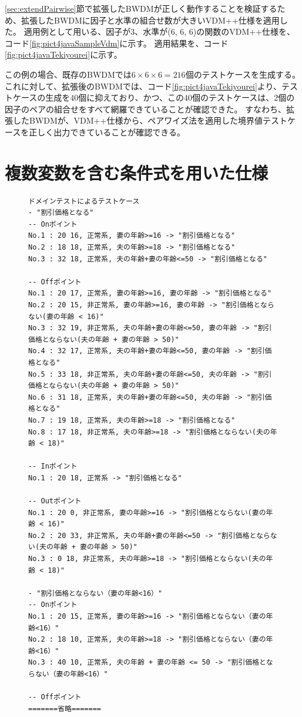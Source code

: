 \documentclass[uplatex, report, a4j, 10pt]{jsbook}
\begin{document}
\ref{sec:extendPairwise}節で拡張したBWDMが正しく動作することを検証するため、拡張したBWDMに因子と水準の組合せ数が大きいVDM++仕様を適用した。
適用例として用いる、因子が3、水準が(6, 6, 6)の関数のVDM++仕様を、コード\ref{fig:pict4javaSampleVdm}に示す。
適用結果を、コード\ref{fig:pict4javaTekiyourei}に示す。

この例の場合、既存のBWDMでは$6 \times 6 \times 6 = 216個$のテストケースを生成する。
これに対して、拡張後のBWDMでは、コード\ref{fig:pict4javaTekiyourei}より、テストケースの生成を40個に抑えており、かつ、この40個のテストケースは、2個の因子のペアの組合せをすべて網羅できていることが確認できた。
すなわち、拡張したBWDMが、VDM++仕様から、ペアワイズ法を適用した境界値テストケースを正しく出力できていることが確認できる。


\section{複数変数を含む条件式を用いた仕様}
\lstset{language=}
\begin{figure}[tp]
  \begin{lstlisting}[caption={拡張したBWDMに遊園地チケット割引機能(コード\ref{fig:vdm_park})を適用した際の出力の一部},label=fig:park_testcase]
ドメインテストによるテストケース
- "割引価格となる"
-- Onポイント
No.1 : 20 16, 正常系, 妻の年齢>=16 -> "割引価格となる"
No.2 : 18 18, 正常系, 夫の年齢>=18 -> "割引価格となる"
No.3 : 32 18, 正常系, 夫の年齢+妻の年齢<=50 -> "割引価格となる"

-- Offポイント
No.1 : 20 17, 正常系, 妻の年齢>=16, 妻の年齢 -> "割引価格となる"
No.2 : 20 15, 非正常系, 妻の年齢>=16, 妻の年齢 -> "割引価格とならない(妻の年齢 < 16)"
No.3 : 32 19, 非正常系, 夫の年齢+妻の年齢<=50, 妻の年齢 -> "割引価格とならない(夫の年齢 + 妻の年齢 > 50)"
No.4 : 32 17, 正常系, 夫の年齢+妻の年齢<=50, 妻の年齢 -> "割引価格となる"
No.5 : 33 18, 非正常系, 夫の年齢+妻の年齢<=50, 夫の年齢 -> "割引価格とならない(夫の年齢 + 妻の年齢 > 50)"
No.6 : 31 18, 正常系, 夫の年齢+妻の年齢<=50, 夫の年齢 -> "割引価格となる"
No.7 : 19 18, 正常系, 夫の年齢>=18 -> "割引価格となる"
No.8 : 17 18, 非正常系, 夫の年齢>=18 -> "割引価格とならない(夫の年齢 < 18)"

-- Inポイント
No.1 : 20 18, 正常系 -> "割引価格となる"

-- Outポイント
No.1 : 20 0, 非正常系, 妻の年齢>=16 -> "割引価格とならない(妻の年齢 < 16)"
No.2 : 20 33, 非正常系, 夫の年齢+妻の年齢<=50 -> "割引価格とならない(夫の年齢 + 妻の年齢 > 50)"
No.3 : 0 18, 非正常系, 夫の年齢>=18 -> "割引価格とならない(夫の年齢 < 18)"

- "割引価格とならない（妻の年齢<16）"
-- Onポイント
No.1 : 20 15, 正常系, 妻の年齢>=16 -> "割引価格とならない（妻の年齢<16）"
No.2 : 18 10, 正常系, 夫の年齢>=18 -> "割引価格とならない（妻の年齢<16）"
No.3 : 40 10, 正常系, 夫の年齢 + 妻の年齢 <= 50 -> "割引価格とならない（妻の年齢<16）"

-- Offポイント
=======省略=======
\end{lstlisting}
\end{figure}
\end{document}
